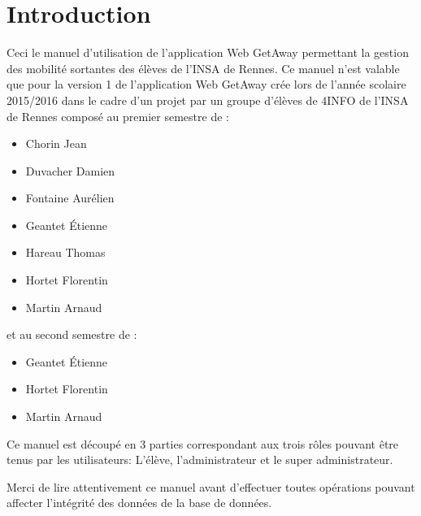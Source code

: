 \chapter{Introduction}

Ceci le manuel d'utilisation de l'application Web GetAway permettant la gestion des mobilité sortantes des élèves de l'INSA de Rennes.
\bigbreak
Ce manuel n'est valable que pour la version 1 de l'application Web GetAway crée lors de l'année scolaire 2015/2016 dans le cadre d'un projet par un groupe d'élèves de 4INFO de l'INSA de Rennes composé au premier semestre de :

\begin{itemize}
	\item Chorin Jean
	\item Duvacher Damien
	\item Fontaine Aurélien
	\item Geantet Étienne
	\item Hareau Thomas
	\item Hortet Florentin
	\item Martin Arnaud
\end{itemize}
\bigbreak

et au second semestre de :

\begin{itemize}
	\item Geantet Étienne
	\item Hortet Florentin
	\item Martin Arnaud
\end{itemize}


Ce manuel est découpé en 3 parties correspondant aux trois rôles pouvant être tenus par les utilisateurs: L'élève, l'administrateur et le super administrateur.

\bigbreak 

\att Merci de lire attentivement ce manuel avant d'effectuer toutes opérations pouvant affecter l'intégrité des données de la base de données.